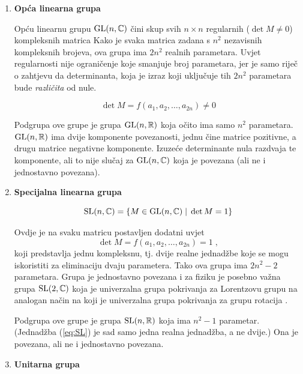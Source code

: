 \begin{enumerate}[leftmargin=0pt, itemindent=0pt]

\item \textbf{Opća linearna grupa}

Opću linearnu grupu $\mathrm{GL}(n, \mathbb{C})$ čini
skup svih $n\times n$ regularnih ($\det M \neq 0$)
kompleksnih matrica
Kako je svaka matrica zadana s $n^2$ nezavisnih kompleksnih brojeva, ova
grupa ima $2 n^2$ realnih parametara. Uvjet regularnosti nije ograničenje
koje smanjuje broj parametara, jer je samo riječ o zahtjevu da determinanta,
koja je izraz koji uključuje tih $2 n^2$ parametara bude \emph{različita} od nule.

\begin{equation}
\det M = f(a_1, a_2 , \dots, a_{2n}) \neq 0
\end{equation}

Podgrupa ove grupe je grupa $\mathrm{GL}(n, \mathbb{R})$ koja očito ima samo
$n^2$ parametara. $\mathrm{GL}(n, \mathbb{R})$ ima dvije komponente povezanosti,
jednu čine matrice pozitivne, a drugu matrice negativne komponente.
Izuzeće determinante nula razdvaja te komponente, ali to nije slučaj
za $\mathrm{GL}(n, \mathbb{C})$ koja je povezana (ali ne i jednostavno povezana).

\item \textbf{Specijalna linearna grupa}

\begin{equation}
\mathrm{SL}(n, \mathbb{C}) = \{ M\in \mathrm{GL}(n,\mathbb{C}) \; | \; \det M = 1\}
\end{equation}

Ovdje je na svaku matricu postavljen dodatni uvjet
\begin{equation}
\det M = f(a_1, a_2 , \dots, a_{2n}) = 1 \;,
\label{eq:SL}
\end{equation}
koji predstavlja jednu kompleksnu, tj. dvije realne jednadžbe koje
se mogu iskoristiti za eliminaciju dvaju parametera. Tako ova grupa
ima $2 n^2 - 2$ parametara. Grupa je jednostavno povezana i za fiziku
je posebno važna grupa $\mathrm{SL}(2, \mathbb{C})$ koja je univerzalna grupa
pokrivanja za Lorentzovu grupu na analogan način na koji je 
univerzalna grupa pokrivanja za grupu rotacija .

Podgrupa ove grupe je grupa $\mathrm{SL}(n, \mathbb{R})$ koja ima 
$n^2 - 1$ parametar. (Jednadžba (\ref{eq:SL}) je sad samo jedna
realna jednadžba, a ne dvije.) Ona je povezana, ali ne i jednostavno
povezana.

\item \textbf{Unitarna grupa}


\end{enumerate}
